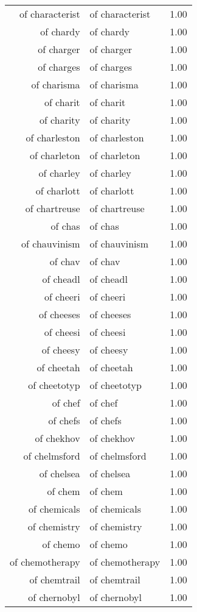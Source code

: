 \begin{table}[ht]
\begin{tabular}{rlr}
  of characterist & of characterist & 1.00 \\ 
  of chardy & of chardy & 1.00 \\ 
  of charger & of charger & 1.00 \\ 
  of charges & of charges & 1.00 \\ 
  of charisma & of charisma & 1.00 \\ 
  of charit & of charit & 1.00 \\ 
  of charity & of charity & 1.00 \\ 
  of charleston & of charleston & 1.00 \\ 
  of charleton & of charleton & 1.00 \\ 
  of charley & of charley & 1.00 \\ 
  of charlott & of charlott & 1.00 \\ 
  of chartreuse & of chartreuse & 1.00 \\ 
  of chas & of chas & 1.00 \\ 
  of chauvinism & of chauvinism & 1.00 \\ 
  of chav & of chav & 1.00 \\ 
  of cheadl & of cheadl & 1.00 \\ 
  of cheeri & of cheeri & 1.00 \\ 
  of cheeses & of cheeses & 1.00 \\ 
  of cheesi & of cheesi & 1.00 \\ 
  of cheesy & of cheesy & 1.00 \\ 
  of cheetah & of cheetah & 1.00 \\ 
  of cheetotyp & of cheetotyp & 1.00 \\ 
  of chef & of chef & 1.00 \\ 
  of chefs & of chefs & 1.00 \\ 
  of chekhov & of chekhov & 1.00 \\ 
  of chelmsford & of chelmsford & 1.00 \\ 
  of chelsea & of chelsea & 1.00 \\ 
  of chem & of chem & 1.00 \\ 
  of chemicals & of chemicals & 1.00 \\ 
  of chemistry & of chemistry & 1.00 \\ 
  of chemo & of chemo & 1.00 \\ 
  of chemotherapy & of chemotherapy & 1.00 \\ 
  of chemtrail & of chemtrail & 1.00 \\ 
  of chernobyl & of chernobyl & 1.00 \\ 

\end{tabular}
\end{table}
